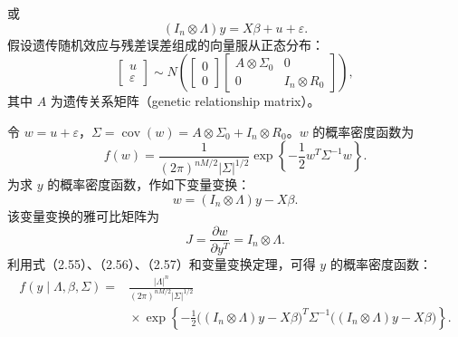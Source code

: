 或
\[
(I_n\otimes\Lambda)y=X\beta+u+\varepsilon.
\]
假设遗传随机效应与残差误差组成的向量服从正态分布：
\begin{equation}
\begin{bmatrix}u\\\varepsilon\end{bmatrix}
\sim N\left(
\begin{bmatrix}0\\0\end{bmatrix}
\begin{bmatrix}A\otimes\Sigma_0&0\\0&I_n\otimes R_0\end{bmatrix}
\right),
\tag{2.54}
\end{equation}
其中 $A$ 为遗传关系矩阵（genetic relationship matrix）。

令 $w=u+\varepsilon$，$\Sigma=\operatorname{cov}(w)=A\otimes\Sigma_0+I_n\otimes R_0$。$w$ 的概率密度函数为
\begin{equation}
f(w)=\frac1{(2\pi)^{nM/2}|\Sigma|^{1/2}}
\exp\left\{-\frac12w^T\Sigma^{-1}w\right\}.
\tag{2.55}
\end{equation}
为求 $y$ 的概率密度函数，作如下变量变换：
\begin{equation}
w=(I_n\otimes\Lambda)y-X\beta.
\tag{2.56}
\end{equation}
该变量变换的雅可比矩阵为
\begin{equation}
J=\frac{\partial w}{\partial y^T}=I_n\otimes\Lambda.
\tag{2.57}
\end{equation}
利用式（2.55）、（2.56）、（2.57）和变量变换定理，可得 $y$ 的概率密度函数：
\begin{equation}
\begin{aligned}
f(y\mid\Lambda,\beta,\Sigma)
={}&\frac{|\Lambda|^n}{(2\pi)^{nM/2}|\Sigma|^{1/2}}\\
&{}\times\exp\left\{-\frac12
\bigl((I_n\otimes\Lambda)y-X\beta\bigr)^T\Sigma^{-1}
\bigl((I_n\otimes\Lambda)y-X\beta\bigr)\right\}.
\end{aligned}\tag{2.58}
\end{equation}
\FloatBarrier
